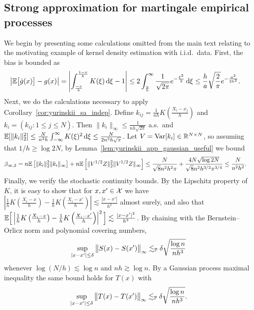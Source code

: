 \subsection{Strong approximation for martingale empirical processes}

We begin by presenting some calculations omitted from the main text
relating to the motivating example of kernel density estimation with
i.i.d.\ data.
First, the bias is bounded as
%
\begin{align*}
  \big| \E \big[ \hat g(x) \big] - g(x) \big|
  &=
  \left|
  \int_{\frac{-x}{h}}^{\frac{1-x}{h}}
  K(\xi)
  \diff \xi
  - 1
  \right|
  \leq
  2 \int_{\frac{a}{h}}^\infty
  \frac{1}{\sqrt{2 \pi}}
  e^{-\frac{\xi^2}{2}}
  \diff \xi
  \leq
  \frac{h}{a}
  \sqrt{\frac{2}{\pi}}
  e^{-\frac{a^2}{2 h^2}}.
\end{align*}
%
Next, we do the calculations necessary to apply
Corollary~\ref{cor:yurinskii_sa_indep}.
Define $k_{i j} = \frac{1}{n h} K \left( \frac{X_i - x_j}{h} \right)$ and
$k_i = (k_{i j} : 1 \leq j \leq N)$.
Then $\|k_i\|_\infty \leq \frac{1}{n h \sqrt{2 \pi}}$ a.s.\ and
$\E[\|k_i\|_2^2] \leq \frac{N}{n^2 h} \int_{-\infty}^\infty K(\xi)^2 \diff \xi
\leq \frac{N}{2 n^2 h \sqrt{\pi}}$.
Let $V = \Var[k_i] \in \R^{N \times N}$,
so assuming that $1/h \geq \log 2 N$,
by Lemma~\ref{lem:yurinskii_app_gaussian_useful} we bound
%
\begin{align*}
  \beta_{\infty,2}
  &=
  n \E\left[\| k_i \|^2_2 \| k_i \|_\infty
  \right]
  + n \E \left[ \|V^{1/2} Z \|^2_2 \|V^{1/2} Z \|_\infty \right]
  \leq
  \frac{N}{\sqrt{8} n^2 h^2 \pi}
  + \frac{4 N \sqrt{\log 2 N}}{\sqrt{8} n^2 h^{3/2} \pi^{3/4}}
  \leq
  \frac{N}{n^2 h^2}.
\end{align*}
%
Finally, we verify the stochastic continuity bounds.
By the Lipschitz property of $K$, it is easy to show that
for $x,x' \in \cX$ we have
$\left|\frac{1}{h} K \left( \frac{X_i - x}{h} \right)
- \frac{1}{h} K \left( \frac{X_i - x'}{h} \right)\right|
\lesssim \frac{|x-x'|}{h^2}$ almost surely, and also that
$\E \Big[ \left|\frac{1}{h} K \left( \frac{X_i - x}{h} \right)
- \frac{1}{h} K \left( \frac{X_i - x'}{h} \right)\right|^2 \Big]
\lesssim \frac{|x-x'|^2}{h^3}$.
By chaining with the Bernstein--Orlicz norm and polynomial covering numbers,
%
\begin{align*}
  \sup_{|x-x'| \leq \delta}
  \big\|S(x) - S(x')\big\|_\infty
  \lesssim_\P
  \delta
  \sqrt{\frac{\log n}{n h^3}}
\end{align*}
%
whenever $\log(N/h) \lesssim \log n$ and $n h \gtrsim \log n$.
By a Gaussian process maximal inequality
\citep[Corollary~2.2.8]{van1996weak}
the same bound holds for $T(x)$ with
%
\begin{align*}
  \sup_{|x-x'| \leq \delta}
  \big\|T(x) - T(x')\big\|_\infty
  \lesssim_\P
  \delta
  \sqrt{\frac{\log n}{n h^3}}.
\end{align*}

